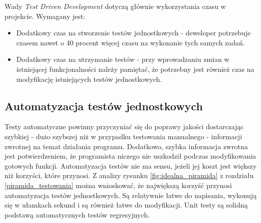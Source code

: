 Wady \textit{Test Driven Development} dotyczą głównie wykorzystania czasu w projekcie. Wymagany jest:

\begin{itemize}
\item
Dodatkowy czas na stworzenie testów jednostkowych - deweloper potrzebuje czasem nawet o 40 procent więcej czasu na wykonanie tych samych zadań.
\item
Dodatkowy czas na utrzymanie testów - przy wprowadzaniu zmian w istniejącej funkcjonalności należy pamiętać, że potrzebny jest również czas na modyfikację istniejących testów jednostkowych.
\end{itemize}

\subsection{Automatyzacja testów jednostkowych}
Testy automatyczne powinny przyczyniać się do poprawy jakości dostarczając szybkiej - dużo szybszej niż w przypadku testowania manualnego - informacji zwrotnej na temat działania programu. Dodatkowo, szybka informacja zwrotna jest potwierdzeniem, że programista niczego nie uszkodził podczas modyfikowania gotowych funkcji.
Automatyzacja testów nie ma sensu, jeżeli jej koszt jest większy niż korzyści, które przynosi. Z analizy rysunku \ref{fig:idealna_piramida} z rozdziału \ref{piramida_testowania} można wnioskować, że największą korzyść przynosi automatyzacja testów jednostkowych. Są relatywnie łatwe do napisania, wykonują się w ułamkach sekund i są również łatwe do modyfikacji. Unit testy są solidną podstawą automatycznych testów regresyjnych.

